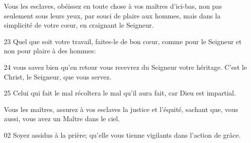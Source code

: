  Vous les esclaves, obéissez en toute chose à vos maîtres d’ici-bas, non pas seulement sous leurs yeux, par souci de plaire aux hommes, mais dans la simplicité de votre cœur, en craignant le Seigneur. 

23 Quel que soit votre travail, faites-le de bon cœur, comme pour le Seigneur et non pour plaire à des hommes:

24 vous savez bien qu’en retour vous recevrez du Seigneur votre héritage. C’est le Christ, le Seigneur, que vous servez.

25 Celui qui fait le mal récoltera le mal qu’il aura fait, car Dieu est impartial.

Vous les maîtres, assurez à vos esclaves la justice et l’équité, sachant que, vous aussi, vous avez un Maître dans le ciel.

02 Soyez assidus à la prière; qu’elle vous tienne vigilants dans l’action de grâce.